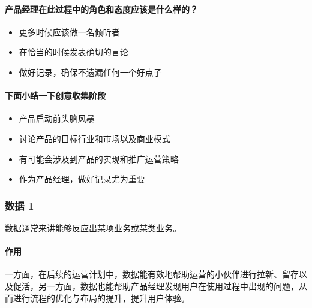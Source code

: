 \documentclass[letterpaper,10pt,english]{sphinxmanual}
\begin{document}
\paragraph{产品经理在此过程中的角色和态度应该是什么样的？}
\label{\detokenize{chapter_idea/create:id6}}\begin{itemize}
\item {} 
更多时候应该做一名倾听者

\item {} 
在恰当的时候发表确切的言论

\item {} 
做好记录，确保不遗漏任何一个好点子

\end{itemize}


\paragraph{下面小结一下创意收集阶段}
\label{\detokenize{chapter_idea/create:id7}}\begin{itemize}
\item {} 
产品启动前头脑风暴

\item {} 
讨论产品的目标行业和市场以及商业模式

\item {} 
有可能会涉及到产品的实现和推广运营策略

\item {} 
作为产品经理，做好记录尤为重要

\end{itemize}


\subsubsection{数据 1\sphinxfootnotemark[373]}
\label{\detokenize{chapter_idea/data:id1}}\label{\detokenize{chapter_idea/data::doc}}%
\begin{footnotetext}[373]\sphinxAtStartFootnote
{}
%
\end{footnotetext}\ignorespaces 
数据通常来讲能够反应出某项业务或某类业务。


\paragraph{作用}
\label{\detokenize{chapter_idea/data:id2}}
一方面，在后续的运营计划中，数据能有效地帮助运营的小伙伴进行拉新、留存以及促活，另一方面，数据也能帮助产品经理发现用户在使用过程中出现的问题，从而进行流程的优化与布局的提升，提升用户体验。%
\begin{footnote}[374]\sphinxAtStartFootnote
{}
%
\end{footnote}
\end{document}
